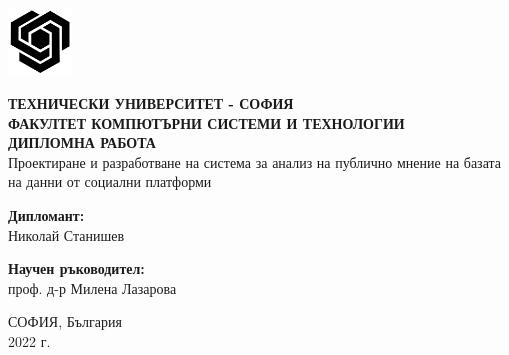 \documentclass{article}
\begin{document}
    \begin{titlepage}
        \vspace*{-3cm}\hspace*{15cm}\includegraphics[width=64px, keepaspectratio]{title-page/tu-logo.png}
        \begin{center}
            \textsc{{\textbf{ТЕХНИЧЕСКИ УНИВЕРСИТЕТ - СОФИЯ} \\}}
            \textsc{{\textbf{ФАКУЛТЕТ КОМПЮТЪРНИ СИСТЕМИ И ТЕХНОЛОГИИ} \\}}
            \vspace{40mm}
            \huge{\textbf{ДИПЛОМНА РАБОТА} \\}
            \vspace{15mm}
            \textnormal{ \LARGE{Проектиране и разработване на система за анализ на публично мнение на базата на данни от социални платформи\\}}
        \end{center}
        \vspace{20mm}
        \begin{minipage}[t]{0.47\textwidth}
            \textnormal{\large{\bf Дипломант:\\}}
            {\large Николай Станишев}
        \end{minipage}\hfill\begin{minipage}[t]{0.47\textwidth}
                                \raggedleft
                                \textnormal{\large{\bf Научен ръководител:\\}}
                                {\large проф. д-р Милена Лазарова}
        \end{minipage}
        \vspace{50mm}

        \begin{center}
        {\large{СОФИЯ, България}}
            \\
            {\large{2022 г.}}
        \end{center}
    \end{titlepage}

    

    
\end{document}
